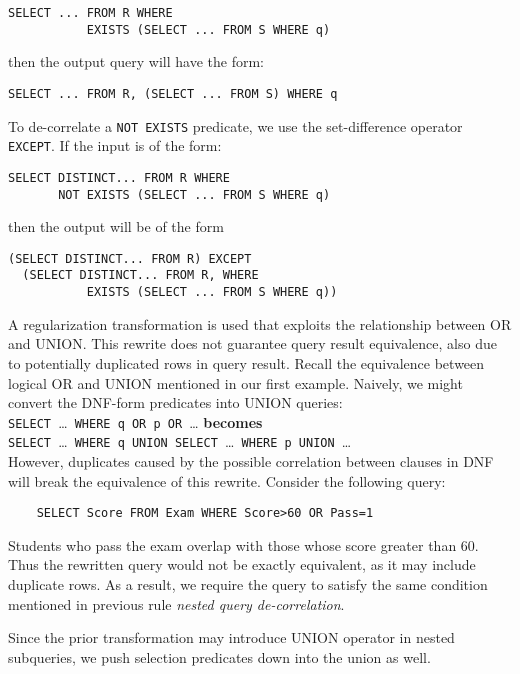 {\footnotesize
\begin{verbatim}
SELECT ... FROM R WHERE 
           EXISTS (SELECT ... FROM S WHERE q)
\end{verbatim}
}

then the output query will have the form:

{\footnotesize
\begin{verbatim}
SELECT ... FROM R, (SELECT ... FROM S) WHERE q
\end{verbatim}
}

To de-correlate a \texttt{NOT EXISTS} predicate, we use the set-difference operator \texttt{EXCEPT}.  
If the input is of the form:
{\footnotesize
\begin{verbatim}
SELECT DISTINCT... FROM R WHERE 
       NOT EXISTS (SELECT ... FROM S WHERE q)
\end{verbatim}
}
then the output will be of the form
{\footnotesize
\begin{verbatim}
(SELECT DISTINCT... FROM R) EXCEPT 
  (SELECT DISTINCT... FROM R, WHERE 
           EXISTS (SELECT ... FROM S WHERE q))
\end{verbatim}
}

A regularization transformation is used that exploits the relationship between OR and UNION. 
This rewrite does not guarantee query result equivalence, also due to potentially duplicated rows in query result.
Recall the equivalence between logical OR and UNION mentioned in our first example. 
Naively, we might convert the DNF-form predicates into UNION queries:\\
\noindent\texttt{SELECT }\ldots\texttt{ WHERE q OR p OR }\ldots\texttt{} \textbf{becomes}\\
\hspace*{5mm}\texttt{SELECT }\ldots\texttt{ WHERE q UNION SELECT }\ldots\texttt{ WHERE p UNION }\ldots\\
However, duplicates caused by the possible correlation between clauses in DNF will break the equivalence of this rewrite. Consider the following query:
{\footnotesize
\begin{verbatim}
	SELECT Score FROM Exam WHERE Score>60 OR Pass=1
\end{verbatim}
}
Students who pass the exam overlap with those whose score greater than 60.
Thus the rewritten query would not be exactly equivalent, as it may include duplicate rows.
As a result, we require the query to satisfy the same condition mentioned in previous rule \textit{nested query de-correlation}.

 Since the prior transformation may introduce UNION operator in nested subqueries, we push selection predicates down into the union as well.